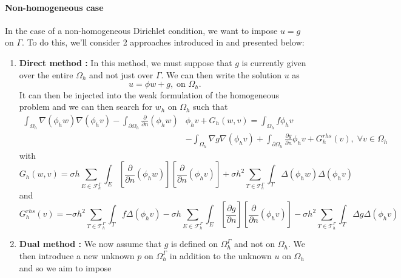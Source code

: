 \paragraph{Non-homogeneous case}

In the case of a non-homogeneous Dirichlet condition, we want to impose $u=g$ on $\Gamma$. To do this, we'll consider 2 approaches introduced in  and presented below:

\begin{enumerate}[label=\textbullet]
	\item \textbf{Direct method :} In this method, we must suppose that $g$ is currently given over the entire $\Omega_h$ and not just over $\Gamma$. We can then write the solution $u$ as
	\begin{equation*}
		u=\phi w +g, \; \text{on } \Omega_h.
	\end{equation*}
	It can then be injected into the weak formulation of the homogeneous problem and we can then search for $w_h$ on $\Omega_h$ such that
	\begin{align*}
		\int_{\Omega_h}\nabla(\phi_h w)\nabla(\phi_h v)-\int_{\partial\Omega_h}\frac{\partial}{\partial n}(\phi_h w)&\phi_h v+G_h(w,v)=\int_{\Omega_h}f\phi_h v \\
		&-\int_{\Omega_h}\nabla g\nabla(\phi_h v)+\int_{\partial\Omega_h}\frac{\partial g}{\partial n}\phi_h v+G_h^{rhs}(v), \; \forall v\in \Omega_h
	\end{align*}
	with
	\begin{equation*}
		G_h(w,v)=\sigma h\sum_{E\in\mathcal{F}_h^\Gamma}\int_E\left[\frac{\partial}{\partial n}(\phi_h w)\right]\left[\frac{\partial}{\partial n}(\phi_h v)\right]+\sigma h^2\sum_{T\in\mathcal{T}_h^\Gamma}\int_T \Delta(\phi_h w)\Delta(\phi_h v)
	\end{equation*}
	and
	\begin{equation*}
		G_h^{rhs}(v)=-\sigma h^2\sum_{T\in\mathcal{T}_h^\Gamma}\int_T f\Delta(\phi_h v)-\sigma h\sum_{E\in\mathcal{F}_h^\Gamma}\int_E\left[\frac{\partial g}{\partial n}\right]\left[\frac{\partial}{\partial n}(\phi_h v)\right]-\sigma h^2\sum_{T\in\mathcal{T}_h^\Gamma}\int_T \Delta g\Delta(\phi_h v)
	\end{equation*}
	\item \textbf{Dual method :} We now assume that $g$ is defined on $\Omega_h^\Gamma$ and not on $\Omega_h$. We then introduce a new unknown $p$ on $\Omega_h^\Gamma$ in addition to the unknown $u$ on $\Omega_h$ and so we aim to impose
	\begin{equation*}

\end{equation*}
\end{enumerate}
